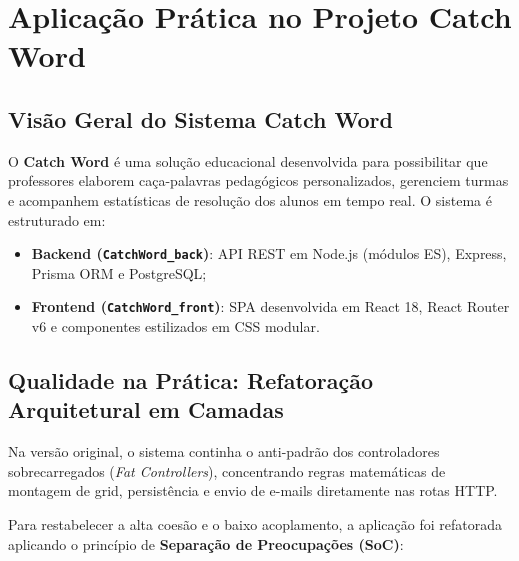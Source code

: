 \documentclass[12pt,a4paper]{article}
\begin{document}
\section{Aplicação Prática no Projeto Catch Word}

\subsection{Visão Geral do Sistema Catch Word}
O \textbf{Catch Word} é uma solução educacional desenvolvida para possibilitar que professores elaborem caça-palavras pedagógicos personalizados, gerenciem turmas e acompanhem estatísticas de resolução dos alunos em tempo real. O sistema é estruturado em:
\begin{itemize}
    \item \textbf{Backend (\texttt{CatchWord\_back})}: API REST em Node.js (módulos ES), Express, Prisma ORM e PostgreSQL;
    \item \textbf{Frontend (\texttt{CatchWord\_front})}: SPA desenvolvida em React 18, React Router v6 e componentes estilizados em CSS modular.
\end{itemize}

\subsection{Qualidade na Prática: Refatoração Arquitetural em Camadas}
Na versão original, o sistema continha o anti-padrão dos controladores sobrecarregados (\textit{Fat Controllers}), concentrando regras matemáticas de montagem de grid, persistência e envio de e-mails diretamente nas rotas HTTP.

Para restabelecer a alta coesão e o baixo acoplamento, a aplicação foi refatorada aplicando o princípio de \textbf{Separação de Preocupações (SoC)}:
\end{document}
